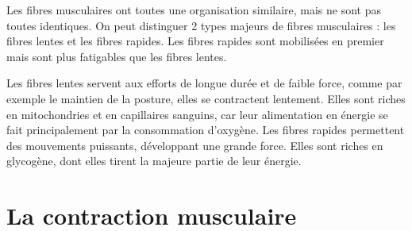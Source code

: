 Les fibres musculaires ont toutes une organisation similaire, mais ne sont pas toutes identiques. 
On peut distinguer 2 types majeurs de fibres musculaires : les fibres lentes et les fibres rapides. Les fibres rapides sont mobilisées en premier mais sont plus fatigables que les fibres lentes.  

Les fibres lentes servent aux efforts de longue durée et de faible force, comme par exemple le maintien de la posture, elles se contractent lentement. 
Elles sont riches en mitochondries et en capillaires sanguins, car leur alimentation en énergie se fait principalement par la consommation d'oxygène. 
Les fibres rapides permettent des mouvements puissants, développant une grande force. Elles sont riches en glycogène, dont elles tirent la majeure partie de leur énergie. 






\section{La contraction musculaire}

